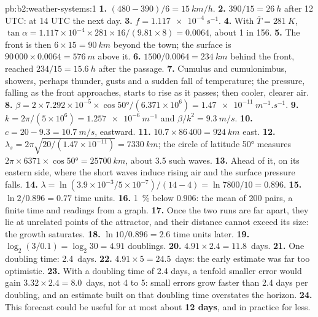 \begin{solution}{pb:b2:weather-systems:1}
\textbf{1.} $(480 - 390)/6 = \qty{15}{km/h}$.
\textbf{2.} $390/15 = \qty{26}{h}$ after 12 UTC: at 14 UTC the next day.
\textbf{3.} $f = \qty{1.117e-4}{s^{-1}}$.
\textbf{4.} With $\bar T = \qty{281}{K}$, $\tan\alpha = 1.117 \times 10^{-4} \times 281 \times
16/(9.81 \times 8) = 0.0064$, about 1 in 156.
\textbf{5.} The front is then $6 \times 15 = \qty{90}{km}$ beyond the town; the surface is
$90\,000 \times 0.0064 = \qty{576}{m}$ above it.
\textbf{6.} $1500/0.0064 = \qty{234}{km}$ behind the front, reached $234/15 = \qty{15.6}{h}$ after
the passage.
\textbf{7.} Cumulus and cumulonimbus, showers, perhaps thunder, gusts and a sudden fall of
temperature; the pressure, falling as the front approaches, starts to rise as it passes; then
cooler, clearer air.
\textbf{8.} $\beta = 2 \times 7.292 \times 10^{-5} \times \cos\ang{50}/(6.371 \times 10^6) =
\qty{1.47e-11}{m^{-1}.s^{-1}}$.
\textbf{9.} $k = 2\pi/(5 \times 10^6) = \qty{1.257e-6}{m^{-1}}$ and $\beta/k^2 = \qty{9.3}{m/s}$.
\textbf{10.} $c = 20 - 9.3 = \qty{10.7}{m/s}$, eastward.
\textbf{11.} $10.7 \times 86\,400 = \qty{924}{km}$ east.
\textbf{12.} $\lambda_s = 2\pi\sqrt{20/(1.47 \times 10^{-11})} = \qty{7330}{km}$; the circle of
latitude \ang{50} measures $2\pi \times 6371 \times \cos\ang{50} = \qty{25700}{km}$, about 3.5
such waves.
\textbf{13.} Ahead of it, on its eastern side, where the short waves induce rising air and the
surface pressure falls.
\textbf{14.} $\lambda = \ln(3.9 \times 10^{-3}/5 \times 10^{-7})/(14 - 4) = \ln 7800/10 = 0.896$.
\textbf{15.} $\ln 2/0.896 = 0.77$ time units.
\textbf{16.} \qty{1}{\percent} below 0.906: the mean of 200 pairs, a finite time and readings from
a graph.
\textbf{17.} Once the two runs are far apart, they lie at unrelated points of the attractor, and
their distance cannot exceed its size: the growth saturates.
\textbf{18.} $\ln 10/0.896 = 2.6$ time units later.
\textbf{19.} $\log_2(3/0.1) = \log_2 30 = 4.91$ doublings.
\textbf{20.} $4.91 \times 2.4 = 11.8$~days.
\textbf{21.} One doubling time: 2.4~days.
\textbf{22.} $4.91 \times 5 = 24.5$~days: the early estimate was far too optimistic.
\textbf{23.} With a doubling time of 2.4 days, a tenfold smaller error would gain $3.32 \times 2.4
= 8.0$~days, not 4 to 5: small errors grow faster than 2.4 days per doubling, and an
estimate built on that doubling time overstates the horizon.
\textbf{24.} This forecast could be useful for at most about \textbf{12 days}, and in practice
for less.
\end{solution}
